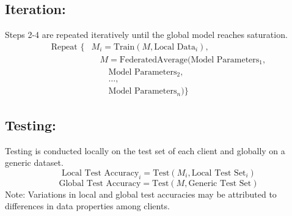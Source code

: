 \documentclass[conference]{IEEEtran}
\begin{document}
\subsection{Iteration:}
Steps 2-4 are repeated iteratively until the global model reaches saturation.
\begin{align*}
\text{Repeat } \{ &M_i = \text{Train}(M, \text{Local Data}_i), \\
&\quad M = \text{FederatedAverage}(\text{Model Parameters}_1, \\
&\quad \quad \text{Model Parameters}_2, \\
&\quad \quad \ldots, \\
&\quad \quad \text{Model Parameters}_n) \}
\end{align*}

\subsection{Testing:}
Testing is conducted locally on the test set of each client and globally on a generic dataset.
\[ \text{Local Test Accuracy}_i = \text{Test}(M_i, \text{Local Test Set}_i) \]
\[ \text{Global Test Accuracy} = \text{Test}(M, \text{Generic Test Set}) \]
Note: Variations in local and global test accuracies may be attributed to differences in data properties among clients.
\end{document}
